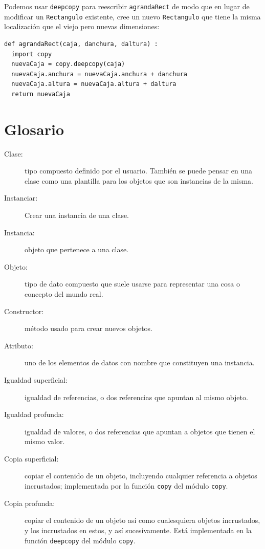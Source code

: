 Podemos usar \texttt{deepcopy} para reescribir \texttt{agrandaRect} de modo que
en lugar de modificar un \texttt{Rectangulo} existente, cree un nuevo
\texttt{Rectangulo} que tiene la misma localización que el viejo pero nuevas
dimensiones:

\beforeverb
\begin{verbatim}
def agrandaRect(caja, danchura, daltura) :
  import copy
  nuevaCaja = copy.deepcopy(caja)
  nuevaCaja.anchura = nuevaCaja.anchura + danchura
  nuevaCaja.altura = nuevaCaja.altura + daltura
  return nuevaCaja
\end{verbatim}
\afterverb
%

\section{Glosario}

\begin{description}

\item[Clase:] tipo compuesto definido por el usuario. También se puede pensar en una
clase como una plantilla para los objetos que son instancias de la misma.

\item[Instanciar:] Crear una instancia de una clase.

\item[Instancia:] objeto que pertenece a una clase.

\item[Objeto:] tipo de dato compuesto que suele usarse para representar
una cosa o concepto del mundo real.

\item[Constructor:] método usado para crear nuevos objetos.

\item[Atributo:] uno de los elementos de datos con nombre que
constituyen una instancia.

\item[Igualdad superficial:] igualdad de referencias, o dos referencias
que apuntan al mismo objeto.

\item[Igualdad profunda:] igualdad de valores, o dos referencias que apuntan
a objetos que tienen el mismo valor.

\item[Copia superficial:] copiar el contenido de un objeto, incluyendo
cualquier referencia a objetos incrustados; implementada por la función \texttt{copy}
del módulo \texttt{copy}.

\item[Copia profunda:] copiar el contenido de un objeto así como cualesquiera
objetos incrustados, y los incrustados en estos, y así sucesivamente. Está implementada 
en la función \texttt{deepcopy} del módulo \texttt{copy}.


\end{description}

